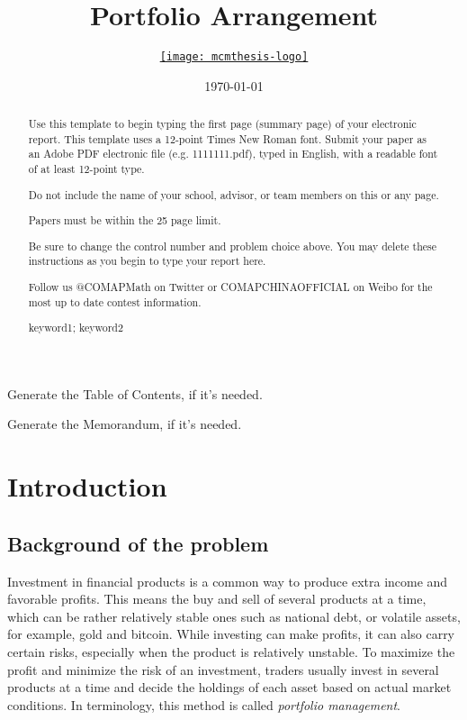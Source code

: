 \documentclass{mcmthesis}
\title{Portfolio Arrangement}
\author{\small \href{https://www.latexstudio.net/}
  {\texttt{[image: mcmthesis-logo]}}}
\date{\today}
\begin{document}
\begin{abstract}
Use this template to begin typing the first page (summary page) of your electronic report. This template uses a 12-point Times New Roman font. Submit your paper as an Adobe PDF electronic file (e.g. 1111111.pdf), typed in English, with a readable font of at least 12-point type.

Do not include the name of your school, advisor, or team members on this or any page.

Papers must be within the 25 page limit.

Be sure to change the control number and problem choice above.
You may delete these instructions as you begin to type your report here.

Follow us @COMAPMath on Twitter or COMAPCHINAOFFICIAL on Weibo for the most up to date contest information.

\begin{keywords}
keyword1; keyword2
\end{keywords}
\end{abstract}
\maketitle

Generate the Table of Contents, if it's needed.
\tableofcontents
\newpage

Generate the Memorandum, if it's needed.
\memodate{\today}
\begin{memo}[Memorandum]
  \lipsum[1-3]
\end{memo}


\section{Introduction}
\subsection{Background of the problem}

 Investment in financial products is a common way to produce extra income and favorable profits.
This means the buy and sell of several products at a time,
which can be rather relatively stable ones such as national debt,
or volatile assets, for example, gold and bitcoin.
While investing can make profits, it can also carry certain risks,
especially when the product is relatively unstable.
To maximize the profit and minimize the risk of an investment,
traders usually invest in several products at a time
and decide the holdings of each asset based on actual market conditions.
In terminology, this method is called \textit{portfolio management}.
\end{document}

